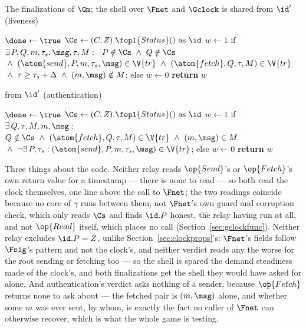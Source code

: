 \documentclass[10pt,oneside,openany]{book}
\theoremstyle{accentdef}
\theoremstyle{accentplain}
\begin{document}
\begin{interface}[nofloat]{The finalizations of $\Gm$; the shell over $\Fnet$ and $\Gclock$ is shared}
 \quad from $\id'$ \quad (liveness)
\begin{algorithmic}[1]
\algcont
\Req{$\neg\done$}
\State $\done \gets \true$
\State $\Cs \gets (C,Z).\fopl{Status}() \text{ as } \id$
\State $w \gets 1$ if $\exists\, P,Q,m,\tau_s,\msg,\tau,M :\ \
       P \notin \Cs \ \wedge\ Q \notin \Cs$ \label{ln:glive}
\State \quad ${}\wedge\ (\atom{send},P,m,\tau_s,\msg) \in \V{tr}
       \ \wedge\ (\atom{fetch},Q,\tau,M) \in \V{tr}$
\State \quad ${}\wedge\ \tau \geq \tau_s + \Delta
       \ \wedge\ (m,\msg) \notin M$;
\State else $w \gets 0$
\State \textbf{return} $w$
\algsave
\end{algorithmic}
\vspace{1.4ex}

 \quad from $\id'$ \quad (authentication)
\begin{algorithmic}[1]
\algcont
\Req{$\neg\done$}
\State $\done \gets \true$
\State $\Cs \gets (C,Z).\fopl{Status}() \text{ as } \id$
\State $w \gets 1$ if $\exists\, Q,\tau,M,m,\msg :$ \label{ln:gauth}
\State \quad $Q \notin \Cs \ \wedge\ (\atom{fetch},Q,\tau,M) \in \V{tr} \ \wedge\ (m,\msg) \in M$
\State \quad ${}\wedge\ \neg\exists\, P,\tau_s : (\atom{send},P,m,\tau_s,\msg) \in \V{tr}$;
\State else $w \gets 0$
\State \textbf{return} $w$
\algsave
\end{algorithmic}
\end{interface}

Three things about the code. Neither relay reads $\op{Send}$'s or $\op{Fetch}$'s own return value
for a timestamp --- there is none to read --- so both read the clock themselves, one line above
the call to $\Fnet$; the two readings coincide because no core of $\gamma$ runs between them, not
$\Fnet$'s own guard and corruption check, which only reads $\Cs$ and finds $\id.P$ honest, the
relay having run at all, and not $\op{Read}$ itself, which places no call
(Section~\ref{sec:gclockfunc}). Neither relay excludes $\id.P = Z$, unlike
Section~\ref{sec:clockprops}'s: $\Fnet$'s fields follow $\Fsig$'s pattern and not the clock's, and
neither verdict reads any the worse for the root sending or fetching too --- so the shell is spared
the demand steadiness made of the clock's, and both finalizations get the shell they would have
asked for alone. And authentication's
verdict asks nothing of a sender, because $\op{Fetch}$ returns none to ask about --- the fetched
pair is $(m,\msg)$ alone, and whether some $m$ was ever sent, by whom, is exactly the fact no
caller of $\Fnet$ can otherwise recover, which is what the whole game is testing.
\end{document}
